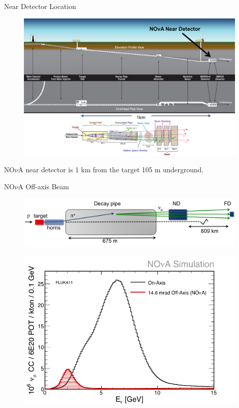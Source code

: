\documentclass{beamer}
\begin{document}
\begin{frame}{Near Detector Location}
\begin{figure}
\centering
\includegraphics[width=\textwidth]{figures/nd_position.png}
\end{figure}
NO$\nu$A near detector is 1 km from the target 105 m underground.
\end{frame}

\begin{frame}{NO$\nu$A Off-axis Beam}
\begin{figure}
\centering
\includegraphics[width=\textwidth]{figures/nd_off_axis.png}
\end{figure}
\begin{figure}
\centering
\includegraphics[width=.6\textwidth]{figures/nd_nu_spec.png}
\end{figure}
\end{frame}
\end{document}
